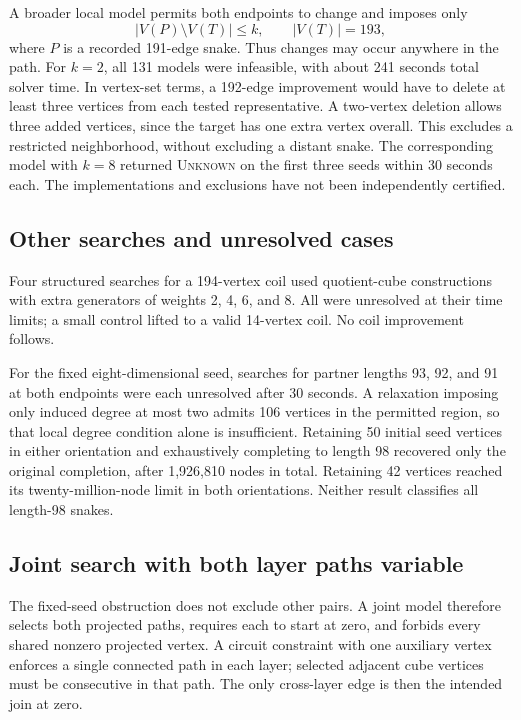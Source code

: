 \documentclass[11pt,a4paper]{article}
\theoremstyle{definition}
\theoremstyle{remark}
\begin{document}
A broader local model permits both endpoints to change and imposes only
\[
|V(P)\setminus V(T)|\le k,\qquad |V(T)|=193,
\]
where $P$ is a recorded 191-edge snake. Thus changes may occur anywhere in the path. For $k=2$, all 131 models were infeasible, with about 241 seconds total solver time. In vertex-set terms, a 192-edge improvement would have to delete at least three vertices from each tested representative. A two-vertex deletion allows three added vertices, since the target has one extra vertex overall. This excludes a restricted neighborhood, without excluding a distant snake. The corresponding model with $k=8$ returned \textsc{Unknown} on the first three seeds within 30 seconds each. The implementations and exclusions have not been independently certified.

\subsection{Other searches and unresolved cases}
Four structured searches for a 194-vertex coil used quotient-cube constructions with extra generators of weights 2, 4, 6, and 8. All were unresolved at their time limits; a small control lifted to a valid 14-vertex coil. No coil improvement follows.

For the fixed eight-dimensional seed, searches for partner lengths 93, 92, and 91 at both endpoints were each unresolved after 30 seconds. A relaxation imposing only induced degree at most two admits 106 vertices in the permitted region, so that local degree condition alone is insufficient. Retaining 50 initial seed vertices in either orientation and exhaustively completing to length 98 recovered only the original completion, after 1,926,810 nodes in total. Retaining 42 vertices reached its twenty-million-node limit in both orientations. Neither result classifies all length-98 snakes.

\subsection{Joint search with both layer paths variable}
The fixed-seed obstruction does not exclude other pairs. A joint model therefore selects both projected paths, requires each to start at zero, and forbids every shared nonzero projected vertex. A circuit constraint with one auxiliary vertex enforces a single connected path in each layer; selected adjacent cube vertices must be consecutive in that path. The only cross-layer edge is then the intended join at zero.
\end{document}
